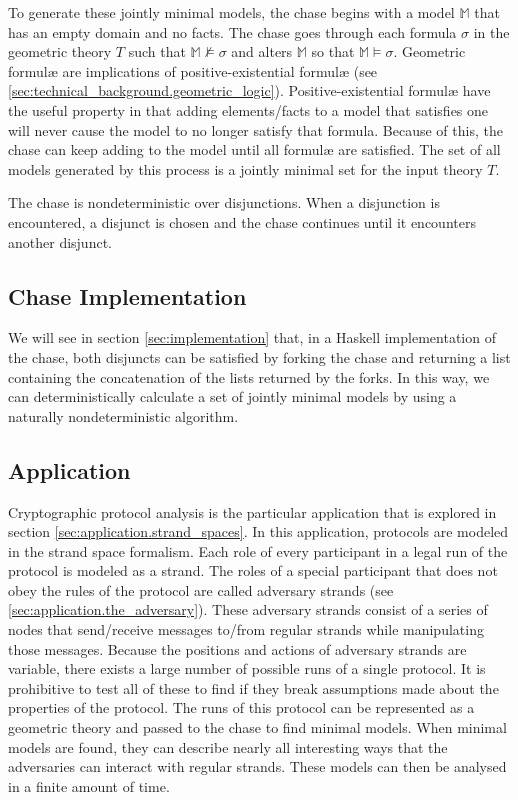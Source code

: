 		To generate these jointly minimal models, the chase begins with a model
		$\mathbb{M}$ that has an empty domain and no facts. The chase goes
		through each formula $\sigma$ in the geometric theory $T$ such that
		$\mathbb{M} \not\models \sigma$ and alters $\mathbb{M}$ so that
		$\mathbb{M} \models \sigma$. Geometric formul{\ae} are implications of
		positive-existential formul{\ae} (see
		\ref{sec:technical_background.geometric_logic}). Positive-existential
		formul{\ae} have the useful property in that adding elements/facts to a
		model that satisfies one will never cause the model to no longer
		satisfy that formula. Because of this, the chase can keep adding to the
		model until all formul{\ae} are satisfied. The set of all models
		generated by this process is a jointly minimal set for the input theory
		$T$.

		The chase is nondeterministic over disjunctions. When a disjunction is
		encountered, a disjunct is chosen and the chase continues until it
		encounters another disjunct.

	\subsection{Chase Implementation}

		We will see in section \ref{sec:implementation} that, in a Haskell
		implementation of the chase, both disjuncts can be satisfied by forking
		the chase and returning a list containing the concatenation of the
		lists returned by the forks. In this way, we can deterministically
		calculate a set of jointly minimal models by using a naturally
		nondeterministic algorithm.

	\subsection{Application}

		Cryptographic protocol analysis is the particular application that is
		explored in section \ref{sec:application.strand_spaces}. In this
		application, protocols are modeled in the strand space formalism. Each
		role of every participant in a legal run of the protocol is modeled as
		a strand. The roles of a special participant that does not obey the
		rules of the protocol are called adversary strands (see
		\ref{sec:application.the_adversary}). These adversary strands consist
		of a series of nodes that send/receive messages to/from regular strands
		while manipulating those messages. Because the positions and actions of
		adversary strands are variable, there exists a large number of possible
		runs of a single protocol. It is prohibitive to test all of these to
		find if they break assumptions made about the properties of the
		protocol. The runs of this protocol can be represented as a geometric
		theory and passed to the chase to find minimal models. When minimal
		models are found, they can describe nearly all interesting ways that
		the adversaries can interact with regular strands. These models can
		then be analysed in a finite amount of time.
